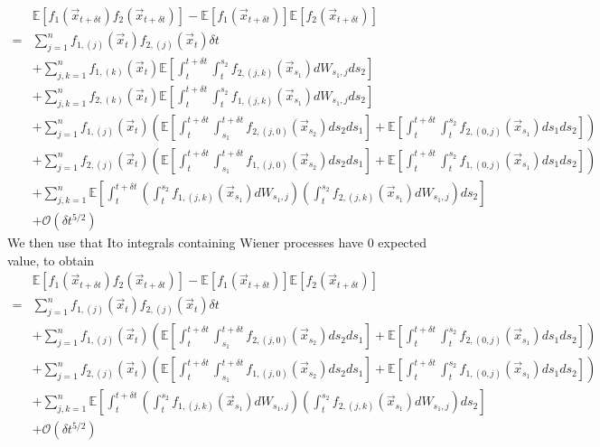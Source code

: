 \documentclass[12pt]{article}
\begin{document}
\begin{equation}
\begin{aligned}
&\mathbb{E} \left[ f_1(\vec{x}_{t + \delta t}) f_2(\vec{x}_{t + \delta t}) \right] 
- \mathbb{E} \left[ f_1(\vec{x}_{t + \delta t}) \right] \mathbb{E} \left[ f_2(\vec{x}_{t + \delta t}) \right] \\
=& 
 \sum_{j=1}^n f_{1,(j)}(\vec{x}_t) f_{2,(j)}(\vec{x}_t) \delta t \\
&+ \sum_{j,k=1}^n f_{1,(k)}(\vec{x}_t) \mathbb{E} \left[  \int_t^{t+\delta t} \int_t^{s_2} f_{2,(j,k)}(\vec{x}_{s_1}) dW_{s_1, j} ds_2 \right] \\
&+  \sum_{j, k=1}^n  f_{2,(k)}(\vec{x}_t)\mathbb{E} \left[ \int_t^{t+\delta t} \int_t^{s_2} f_{1,(j,k)}(\vec{x}_{s_1}) dW_{s_1, j} ds_2 \right]\\
&+ \sum_{j=1}^n f_{1,(j)}(\vec{x}_t) \left( \mathbb{E} \left[ \int_t^{t+\delta t} \int_{s_1}^{t+\delta t} f_{2,(j,0)}(\vec{x}_{s_2}) ds_2 ds_1 \right] 
+ \mathbb{E} \left[  \int_t^{t+\delta t} \int_t^{s_2} f_{2,(0,j)}(\vec{x}_{s_1}) ds_1 ds_2\right] \right) \\
&+  \sum_{j=1}^n f_{2,(j)}(\vec{x}_t) \left( \mathbb{E} \left[ \int_t^{t+\delta t} \int_{s_1}^{t + \delta t} f_{1,(j,0)}(\vec{x}_{s_2}) ds_2 ds_1 \right]
+ \mathbb{E} \left[ \int_t^{t+\delta t} \int_t^{s_2} f_{1,(0,j)}(\vec{x}_{s_1}) ds_1 ds_2 \right] \right) \\
&+ \sum_{j, k=1}^n \mathbb{E} \left[ \int_t^{t+\delta t}\left( \int_t^{s_2} f_{1,(j,k)}(\vec{x}_{s_1}) dW_{s_1, j}  \right) \left(  \int_t^{s_2} f_{2,(j,k)}(\vec{x}_{s_1}) dW_{s_1, j} \right) ds_2 \right] \\
&+ \mathcal{O} (\delta t^{5/2})
\end{aligned}
\end{equation}
%
We then use that Ito integrals containing Wiener processes have 0 expected value, to obtain
\begin{equation}
\begin{aligned}
&\mathbb{E} \left[ f_1(\vec{x}_{t + \delta t}) f_2(\vec{x}_{t + \delta t}) \right] 
- \mathbb{E} \left[ f_1(\vec{x}_{t + \delta t}) \right] \mathbb{E} \left[ f_2(\vec{x}_{t + \delta t}) \right] \\
=& 
 \sum_{j=1}^n f_{1,(j)}(\vec{x}_t) f_{2,(j)}(\vec{x}_t) \delta t \\
&+ \sum_{j=1}^n f_{1,(j)}(\vec{x}_t) \left( \mathbb{E} \left[ \int_t^{t+\delta t} \int_{s_1}^{t+\delta t} f_{2,(j,0)}(\vec{x}_{s_2}) ds_2 ds_1 \right] 
+ \mathbb{E} \left[  \int_t^{t+\delta t} \int_t^{s_2} f_{2,(0,j)}(\vec{x}_{s_1}) ds_1 ds_2\right] \right) \\
&+  \sum_{j=1}^n f_{2,(j)}(\vec{x}_t) \left( \mathbb{E} \left[ \int_t^{t+\delta t} \int_{s_1}^{t + \delta t} f_{1,(j,0)}(\vec{x}_{s_2}) ds_2 ds_1 \right]
+ \mathbb{E} \left[ \int_t^{t+\delta t} \int_t^{s_2} f_{1,(0,j)}(\vec{x}_{s_1}) ds_1 ds_2 \right] \right) \\
&+ \sum_{j, k=1}^n \mathbb{E} \left[ \int_t^{t+\delta t}\left( \int_t^{s_2} f_{1,(j,k)}(\vec{x}_{s_1}) dW_{s_1, j}  \right) \left(  \int_t^{s_2} f_{2,(j,k)}(\vec{x}_{s_1}) dW_{s_1, j} \right) ds_2 \right] \\
&+ \mathcal{O} (\delta t^{5/2})
\end{aligned}
\end{equation}
\end{document}
